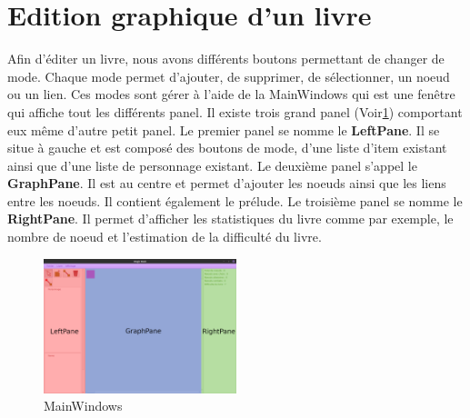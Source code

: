 	\section{Edition graphique d'un livre}
		Afin d'éditer un livre, nous avons différents boutons permettant de changer de mode. Chaque mode permet d'ajouter, de supprimer, de sélectionner, un noeud ou un lien. Ces modes sont gérer à l'aide de la MainWindows qui est une fenêtre qui affiche tout les différents panel. Il existe trois grand panel  (Voir\ref{fig:MainWindows}) comportant eux même d'autre petit panel. Le premier panel se nomme le \textbf{LeftPane}. Il se situe à gauche et est composé des boutons de mode, d'une liste d'item existant ainsi que d'une liste de personnage existant. Le deuxième panel s'appel le \textbf{GraphPane}. Il est au centre et permet d'ajouter les noeuds ainsi que les liens entre les noeuds. Il contient également le prélude. Le troisième panel se nomme le \textbf{RightPane}. Il permet d'afficher les statistiques du livre comme par exemple, le nombre de noeud et l'estimation de la difficulté du livre.\\
		\begin{figure}[H]
			\centering\includegraphics[width=0.50\textwidth]{img/mainwindow.png}
			\caption{MainWindows}
			\label{fig:MainWindows}
		\end{figure}

